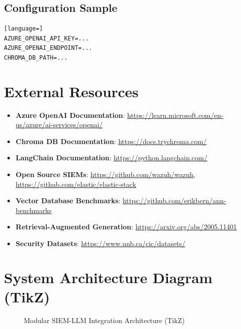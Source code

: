 \documentclass{article}
\begin{document}
\subsection{Configuration Sample}
\begin{lstlisting}[language=]
AZURE_OPENAI_API_KEY=...
AZURE_OPENAI_ENDPOINT=...
CHROMA_DB_PATH=...
\end{lstlisting}

\section*{External Resources}
\begin{itemize}
    \item \textbf{Azure OpenAI Documentation}: \url{https://learn.microsoft.com/en-us/azure/ai-services/openai/}
    \item \textbf{Chroma DB Documentation}: \url{https://docs.trychroma.com/}
    \item \textbf{LangChain Documentation}: \url{https://python.langchain.com/}
    \item \textbf{Open Source SIEMs}: \url{https://github.com/wazuh/wazuh}, \url{https://github.com/elastic/elastic-stack}
    \item \textbf{Vector Database Benchmarks}: \url{https://github.com/erikbern/ann-benchmarks}
    \item \textbf{Retrieval-Augmented Generation}: \url{https://arxiv.org/abs/2005.11401}
    \item \textbf{Security Datasets}: \url{https://www.unb.ca/cic/datasets/}
\end{itemize}

\section*{System Architecture Diagram (TikZ)}
\begin{figure}[h]
    \centering
    \caption{Modular SIEM-LLM Integration Architecture (TikZ)}
\end{figure}
\end{document}

